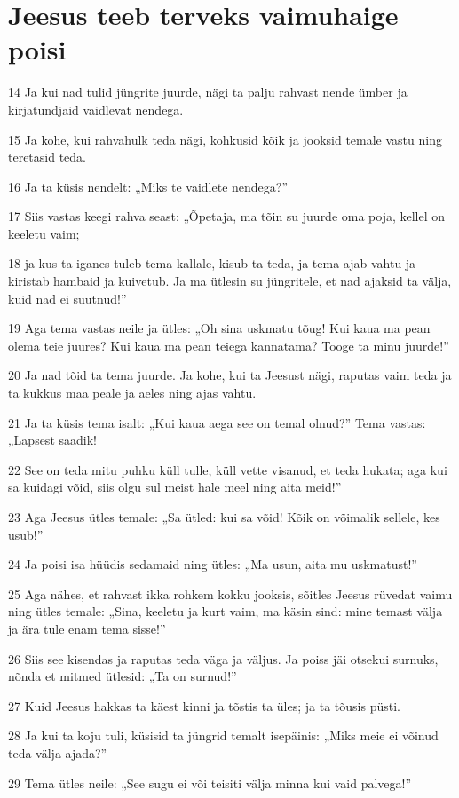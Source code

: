 \section*{Jeesus teeb terveks vaimuhaige poisi}

\par 14 Ja kui nad tulid jüngrite juurde, nägi ta palju rahvast nende ümber ja kirjatundjaid vaidlevat nendega.
\par 15 Ja kohe, kui rahvahulk teda nägi, kohkusid kõik ja jooksid temale vastu ning teretasid teda.
\par 16 Ja ta küsis nendelt: „Miks te vaidlete nendega?”
\par 17 Siis vastas keegi rahva seast: „Õpetaja, ma tõin su juurde oma poja, kellel on keeletu vaim;
\par 18 ja kus ta iganes tuleb tema kallale, kisub ta teda, ja tema ajab vahtu ja kiristab hambaid ja kuivetub. Ja ma ütlesin su jüngritele, et nad ajaksid ta välja, kuid nad ei suutnud!”
\par 19 Aga tema vastas neile ja ütles: „Oh sina uskmatu tõug! Kui kaua ma pean olema teie juures? Kui kaua ma pean teiega kannatama? Tooge ta minu juurde!”
\par 20 Ja nad tõid ta tema juurde. Ja kohe, kui ta Jeesust nägi, raputas vaim teda ja ta kukkus maa peale ja aeles ning ajas vahtu.
\par 21 Ja ta küsis tema isalt: „Kui kaua aega see on temal olnud?” Tema vastas: „Lapsest saadik!
\par 22 See on teda mitu puhku küll tulle, küll vette visanud, et teda hukata; aga kui sa kuidagi võid, siis olgu sul meist hale meel ning aita meid!”
\par 23 Aga Jeesus ütles temale: „Sa ütled: kui sa võid! Kõik on võimalik sellele, kes usub!”
\par 24 Ja poisi isa hüüdis sedamaid ning ütles: „Ma usun, aita mu uskmatust!”
\par 25 Aga nähes, et rahvast ikka rohkem kokku jooksis, sõitles Jeesus rüvedat vaimu ning ütles temale: „Sina, keeletu ja kurt vaim, ma käsin sind: mine temast välja ja ära tule enam tema sisse!”
\par 26 Siis see kisendas ja raputas teda väga ja väljus. Ja poiss jäi otsekui surnuks, nõnda et mitmed ütlesid: „Ta on surnud!”
\par 27 Kuid Jeesus hakkas ta käest kinni ja tõstis ta üles; ja ta tõusis püsti.
\par 28 Ja kui ta koju tuli, küsisid ta jüngrid temalt isepäinis: „Miks meie ei võinud teda välja ajada?”
\par 29 Tema ütles neile: „See sugu ei või teisiti välja minna kui vaid palvega!”

